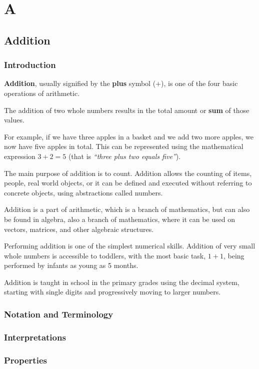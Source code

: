 \documentclass[a4paper]{book}
\begin{document}
\chapter{A}
\section{Addition}
\subsection{Introduction}
\textbf{Addition}, usually signified by the \textbf{plus} symbol ($+$),
is one of the four basic operations of arithmetic.

The addition of two whole numbers results in the total amount or \textbf{sum} of those values.

For example, if we have three apples in a basket and we add two more apples, we now have five apples in total.
This can be represented using the mathematical expression $3 + 2 = 5$
(that is \emph{``three plus two equals five''}).

The main purpose of addition is to count. Addition allows the counting of items, people, real world objects,
or it can be defined and executed without referring to concrete objects, using abstractions called numbers.

Addition is a part of arithmetic, which is a branch of mathematics, but can also be found in algebra, 
also a branch of mathematics, where it can be used on vectors, matrices, and other algebraic structures.

Performing addition is one of the simplest numerical skills. Addition of very small whole numbers is
accessible to toddlers, with the most basic task, $1 + 1$, being performed by infants as young as 5 months.

Addition is taught in school in the primary grades using the decimal system, starting with single digits
and progressively moving to larger numbers.

\subsection{Notation and Terminology}

\subsection{Interpretations}

\subsection{Properties}
\end{document}

